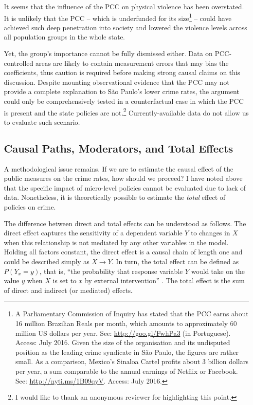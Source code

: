 It seems that the influence of the PCC on physical violence has been overstated. It is unlikely that the PCC -- which is underfunded for its size\footnote{A Parliamentary Commission of Inquiry has stated that the PCC earns about 16 million Brazilian Reals per month, which amounts to approximately 60 million US dollars per year. See: \url{http://goo.gl/FwhPa3} (in Portuguese). Access: July 2016. Given the size of the organisation and its undisputed position as the leading crime syndicate in São Paulo, the figures are rather small. As a comparison, Mexico's Sinaloa Cartel profits about 3 billion dollars per year, a sum comparable to the annual earnings of Netflix or Facebook. See: \url{http://nyti.ms/1B09qyV}. Access: July 2016.} -- could have achieved such deep penetration into society and lowered the violence levels across all population groups in the whole state. 

Yet, the group's importance cannot be fully dismissed either. Data on PCC-controlled areas are likely to contain measurement errors that may bias the coefficients, thus caution is required before making strong causal claims on this discussion. Despite mounting observational evidence that the PCC may not provide a complete explanation to São Paulo's lower crime rates, the argument could only be comprehensively tested in a counterfactual case in which the PCC is present and the state policies are not.\footnote{I would like to thank an anonymous reviewer for highlighting this point.} Currently-available data do not allow us to evaluate such scenario.

\subsection{Causal Paths, Moderators, and Total Effects}
\label{sub:causal_paths_moderators_and_total_effects}

A methodological issue remains. If we are to estimate the causal effect of the public measures on the crime rates, how should we proceed? I have noted above that the specific impact of micro-level policies cannot be evaluated due to lack of data. Nonetheless, it is theoretically possible to estimate the \emph{total} effect of policies on crime. 

The difference between direct and total effects can be understood as follows. The direct effect captures the sensitivity of a dependent variable $Y$ to changes in $X$ when this relationship is not mediated by any other variables in the model. Holding all factors constant, the direct effect is a causal chain of length one \citep[p. 160]{sobel1987direct} and could be described simply as $X \rightarrow Y$. In turn, the total effect can be defined as $P(Y_{x} = y)$, that is, ``the probability that response variable $Y$ would take on the value $y$ when $X$ is set to $x$ by external intervention'' \citep[p. 1572]{pearl2001direct}. The total effect is the sum of direct and indirect (or mediated) effects. 

